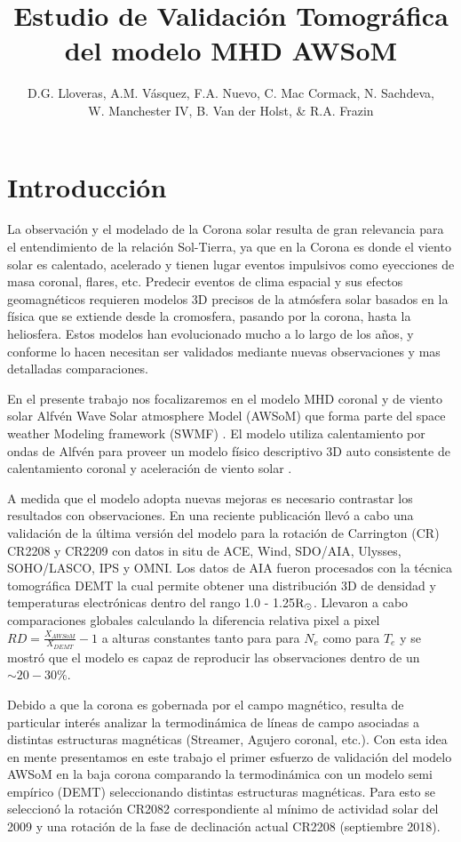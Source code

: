 \documentclass[baaa]{baaa}
\title{Estudio de Validación Tomográfica del modelo MHD AWSoM}
\author{D.G. Lloveras\inst{1}, A.M. Vásquez\inst{1}, F.A. Nuevo\inst{1}, C. Mac Cormack\inst{1}, N. Sachdeva\inst{2},\\ W. Manchester IV\inst{2}, B. Van der Holst\inst{2}, \& R.A. Frazin\inst{2}}
\institute{
Insituto de Astronomía y Física del Espacio, CONICET--UBA, Argentina \and
Climate and Space Sciences and Engineering, Universidad de Michigan, EEUU.
}
\begin{document}
\maketitle

\section{Introducción}
\label{S_intro}
La observación y el modelado de la Corona solar resulta de gran relevancia para el entendimiento de la relación Sol-Tierra, ya que en la Corona es donde el viento solar es calentado, acelerado y tienen lugar eventos impulsivos como eyecciones de masa coronal, flares, etc.
Predecir eventos de clima espacial y sus efectos geomagnéticos requieren modelos 3D precisos de la atmósfera solar basados en la física que se extiende desde la cromosfera, pasando por la corona, hasta la heliosfera. Estos modelos han evolucionado mucho a lo largo de los años, y conforme lo hacen necesitan ser validados mediante nuevas observaciones y mas detalladas comparaciones.

En el presente trabajo nos focalizaremos en el modelo MHD coronal y de viento solar  Alfvén Wave Solar atmosphere Model (AWSoM) que forma parte del space weather Modeling framework (SWMF) \citet{Toth_2012}. El modelo utiliza calentamiento por ondas de Alfvén para proveer un modelo físico descriptivo 3D auto consistente de calentamiento coronal y aceleración de viento solar \citep{sokolov_2013}  \citep{vander_2014}.

A medida que el modelo adopta nuevas mejoras es necesario contrastar los resultados con observaciones. En una reciente publicación \citet{sachdeva_2019} llevó a cabo una validación de la última versión del modelo para la rotación de Carrington (CR) CR2208 y CR2209 con datos \rm{in situ} de ACE, Wind, SDO/AIA, Ulysses, SOHO/LASCO, IPS y OMNI. Los datos de AIA fueron procesados con la técnica tomográfica DEMT \citep{frazin_2009} la cual permite obtener una distribución 3D de densidad y temperaturas electrónicas dentro del rango 1.0 - 1.25${\rm R_\odot}$. Llevaron a cabo comparaciones globales calculando la diferencia relativa pixel a pixel $RD = \frac{X_{AWSoM}}{X_{DEMT}}-1$ a alturas constantes tanto para para $N_e$ como para $T_e$ y se mostró que el modelo es capaz de reproducir las observaciones dentro de un $\sim 20-30\%$. 

Debido a que la corona es gobernada por el campo magnético, resulta de particular interés analizar  la termodinámica de líneas de campo asociadas a distintas estructuras magnéticas (Streamer, Agujero coronal, etc.). Con esta idea en mente presentamos en este trabajo el primer esfuerzo de validación del modelo AWSoM en la baja corona comparando la termodinámica con un modelo semi empírico (DEMT) seleccionando distintas estructuras magnéticas. Para esto se seleccionó la rotación CR2082 correspondiente al mínimo de actividad solar del 2009 y una rotación de la fase de  declinación actual CR2208 (septiembre 2018).
\end{document}

